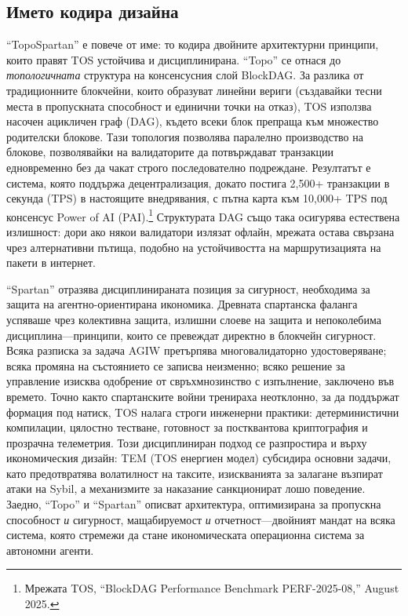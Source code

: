 \documentclass[11pt]{article}
\begin{document}
\subsection{Името кодира дизайна}
``TopoSpartan'' е повече от име: то кодира двойните архитектурни принципи, които правят TOS устойчива и дисциплинирана. ``Topo'' се отнася до \emph{топологичната} структура на консенсусния слой BlockDAG. За разлика от традиционните блокчейни, които образуват линейни вериги (създавайки тесни места в пропускната способност и единични точки на отказ), TOS използва насочен ацикличен граф (DAG), където всеки блок препраща към множество родителски блокове. Тази топология позволява паралелно производство на блокове, позволявайки на валидаторите да потвърждават транзакции едновременно без да чакат строго последователно подреждане. Резултатът е система, която поддържа децентрализация, докато постига 2,500+ транзакции в секунда (TPS) в настоящите внедрявания, с пътна карта към 10,000+ TPS под консенсус Power of AI (PAI).\footnote{Мрежата TOS, ``BlockDAG Performance Benchmark PERF-2025-08,'' August 2025.} Структурата DAG също така осигурява естествена излишност: дори ако някои валидатори излязат офлайн, мрежата остава свързана чрез алтернативни пътища, подобно на устойчивостта на маршрутизацията на пакети в интернет.

``Spartan'' отразява дисциплинираната позиция за сигурност, необходима за защита на агентно-ориентирана икономика. Древната спартанска фаланга успяваше чрез колективна защита, излишни слоеве на защита и непоколебима дисциплина---принципи, които се превеждат директно в блокчейн сигурност. Всяка разписка за задача AGIW претърпява многовалидаторно удостоверяване; всяка промяна на състоянието се записва неизменно; всяко решение за управление изисква одобрение от свръхмнозинство с изпълнение, заключено във времето. Точно както спартанските войни тренираха неотклонно, за да поддържат формация под натиск, TOS налага строги инженерни практики: детерминистични компилации, цялостно тестване, готовност за постквантова криптография и прозрачна телеметрия. Този дисциплиниран подход се разпростира и върху икономическия дизайн: TEM (TOS енергиен модел) субсидира основни задачи, като предотвратява волатилност на таксите, изискванията за залагане възпират атаки на Sybil, а механизмите за наказание санкционират лошо поведение. Заедно, ``Topo'' и ``Spartan'' описват архитектура, оптимизирана за пропускна способност \emph{и} сигурност, мащабируемост \emph{и} отчетност---двойният мандат на всяка система, която стремежи да стане икономическата операционна система за автономни агенти.
\end{document}
